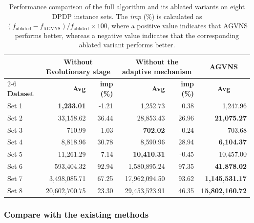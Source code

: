 \documentclass[pdflatex]{sn-jnl}
\begin{document}
\begin{table}[h!]
\centering
\caption{Performance comparison of the full algorithm and its ablated variants on eight DPDP instance sets. The \textit{imp} (\%) is calculated as $(f_{\mathrm{ablated}}-f_{\mathrm{AGVNS}})/f_{\mathrm{ablated}}\times100$, where a positive value indicates that AGVNS performs better, whereas a negative value indicates that the corresponding ablated variant performs better.}
\label{tab:ablation}
\begin{tabular}{|l|rr|rr|r|}
\hline
& \multicolumn{2}{c|}{\textbf{Without Evolutionary stage}} & \multicolumn{2}{c|}{\textbf{Without the adaptive mechanism}} & \multicolumn{1}{c|}{\textbf{AGVNS}} \\ \cmidrule{2-6} 
\textbf{Dataset} & \multicolumn{1}{r}{\textbf{Avg}} & \textbf{imp (\%)} & \multicolumn{1}{r}{\textbf{Avg}} & \textbf{imp (\%)} & \multicolumn{1}{c|}{\textbf{Avg}} \\ \hline \hline
Set 1 & \textbf{1,233.01} & -1.21 & 1,252.73 & 0.38 & 1,247.96 \\ \hline
Set 2 & 33,158.62 & 36.44 & 28,853.43 & 26.96 & \textbf{21,075.27} \\ \hline
Set 3 & 710.99 & 1.03 & \textbf{702.02} & -0.24 & 703.68 \\ \hline
Set 4 & 8,818.96 & 30.78 & 8,590.96 & 28.94 & \textbf{6,104.37} \\ \hline
Set 5 & 11,261.29 & 7.14 & \textbf{10,410.31} & -0.45 & 10,457.00 \\ \hline
Set 6 & 593,404.32 & 92.94 & 1,580,895.24 & 97.35 & \textbf{41,878.02} \\ \hline
Set 7 & 3,498,085.71 & 67.25 & 17,962,094.50 & 93.62 & \textbf{1,145,531.17} \\ \hline
Set 8 & 20,602,700.75 & 23.30 & 29,453,523.91 & 46.35 & \textbf{15,802,160.72} \\ \hline
\end{tabular}
\end{table}

\subsubsection{Compare with the existing methods} 
\end{document}
